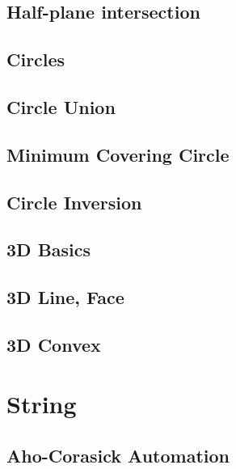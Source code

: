 \subsection{Half-plane intersection}
\raggedbottom
\hrulefill
\subsection{Circles}
\raggedbottom
\hrulefill
\subsection{Circle Union}
\raggedbottom
\hrulefill
\subsection{Minimum Covering Circle}
\raggedbottom
\hrulefill
\subsection{Circle Inversion}
\raggedbottom
\hrulefill
\subsection{3D Basics}
\raggedbottom
\hrulefill
\subsection{3D Line, Face}
\raggedbottom
\hrulefill
\subsection{3D Convex}
\raggedbottom
\hrulefill

\section{String}
\subsection{Aho-Corasick Automation}
\raggedbottom
\hrulefill
